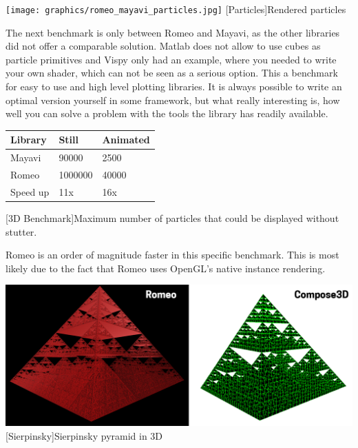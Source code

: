 \begin{minipage}{\linewidth}
    \centering
    \texttt{[image: graphics/romeo\_mayavi\_particles.jpg]}
    [Particles]{Rendered particles}
    \label{fig:reactive1}
\end{minipage}

The next benchmark is only between Romeo and Mayavi, as the other libraries did not offer a comparable solution. Matlab does not allow to use cubes as particle primitives and Vispy only had an example, where you needed to write your own shader, which can not be seen as a serious option. This a benchmark for easy to use and high level plotting libraries. It is always possible to write an optimal version yourself in some framework, but what really interesting is, how well you can solve a problem with the tools the library has readily available.

\begin{table}[htbp]
    \centering
    \begin{tabular}{l|l|l}
        \hline
        \textbf{Library} & \textbf{Still}  & \textbf{Animated}  \\ 
        \hline
        Mayavi           & 90000           & 2500  \\
        Romeo            & 1000000         & 40000 \\
        \hline
        \hline
        Speed up         & 11x             & 16x \\
    \end{tabular}
    [3D Benchmark]{Maximum number of particles that could be displayed without stutter.}
    \label{table:relativespeedoglw}
\end{table}
Romeo is an order of magnitude faster in this specific benchmark. This is most likely due to the fact that Romeo uses OpenGL's native instance rendering.

\begin{minipage}{\linewidth}
    \centering
    \includegraphics[width=\linewidth]{graphics/sierpinsky.jpg}
    [Sierpinsky]{Sierpinsky pyramid in 3D}
    \label{fig:reactive1}
\end{minipage}

